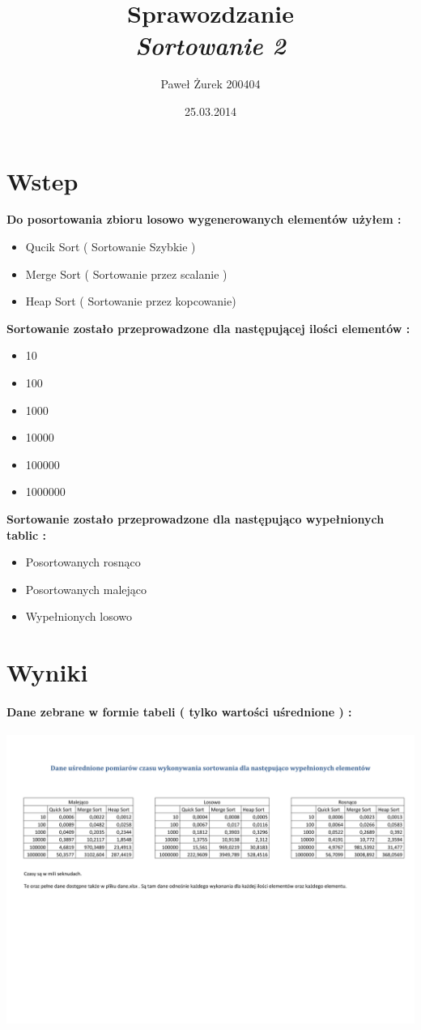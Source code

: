\documentclass[10 pt]{article}
\title{Sprawozdzanie\\ \emph{Sortowanie 2}}
\author{Paweł Żurek 200404}
\date{25.03.2014}
\begin{document}
\tableofcontents
\maketitle
\section{Wstep}
\textbf{Do posortowania zbioru losowo wygenerowanych elementów użyłem : }
\begin{itemize}
\item Qucik Sort ( Sortowanie Szybkie )
\item Merge Sort ( Sortowanie przez scalanie )
\item Heap Sort ( Sortowanie przez kopcowanie)
\end{itemize}
\textbf{Sortowanie zostało przeprowadzone dla następującej ilości elementów : }
\begin{itemize}
\item 10
\item 100
\item 1000
\item 10000
\item 100000
\item 1000000
\end{itemize}
\textbf{Sortowanie zostało przeprowadzone dla następująco wypełnionych tablic : }
\begin{itemize}
\item Posortowanych rosnąco
\item Posortowanych malejąco
\item Wypełnionych losowo
\end{itemize}

\section{Wyniki}

\paragraph{Dane zebrane w formie tabeli ( tylko wartości uśrednione ) : \\}
\begin{center}
\includegraphics[scale=0.5]{DaneUsrednione.pdf}
\end{center}
\newpage
\end{document}
